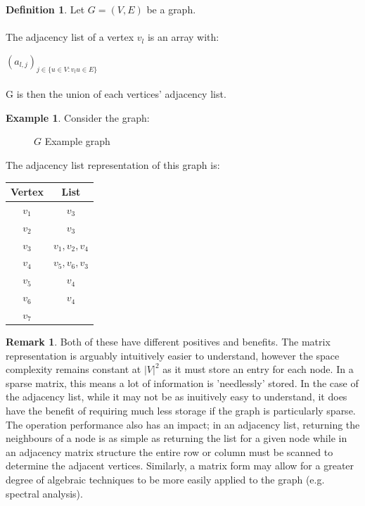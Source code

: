 \documentclass[11pt,reqno]{amsart}
\theoremstyle{definition}
\newtheorem{definition}{Definition}
\newtheorem{remark}[thm]{Remark}
\newtheorem{example}[thm]{Example}
\numberwithin{equation}{section}
\begin{document}
\begin{definition}
	Let $G=(V,E)$ be a graph. \\
	\\
	The adjacency list of a vertex $v_l$ is an array with:
	
	$(a_{l,j})_{j \in \{u \in V : v_lu \in E\}}$\\
	\\
	G is then the union of each vertices' adjacency list.
\end{definition}

\begin{example}
	Consider the graph:
	\begin{figure}[h!]
		\caption{$G$ Example graph}
		\label{fig:Forest9}
	\end{figure}
	
	The adjacency list representation of this graph is:

	\begin{table}[h]
		\begin{tabular}{|c|c|}
			\hline
		\textbf{Vertex}&\textbf{List}\\
		\hline
		$v_1$&$v_3$\\
		\hline
		$v_2$&$v_3$\\
		\hline
		$v_3$&$v_1,v_2,v_4$\\
		\hline
		$v_4$&$v_5,v_6,v_3$\\
		\hline
		$v_5$&$v_4$\\
		\hline
		$v_6$&$v_4$\\
		\hline
		$v_7$&\\
		\hline
		\end{tabular}
	\end{table} 
\end{example}

\begin{remark}
	Both of these have different positives and benefits. The matrix representation is arguably intuitively easier to understand, however the space complexity remains constant at $|V|^2$ as it must store an entry for each node. In a sparse matrix, this means a lot of information is 'needlessly' stored. In the case of the adjacency list, while it may not be as inuitively easy to understand, it does have the benefit of requiring much less storage if the graph is particularly sparse. The operation performance also has an impact; in an adjacency list, returning the neighbours of a node is as simple as returning the list for a given node while in an adjacency matrix structure the entire row or column must be scanned to determine the adjacent vertices. Similarly, a matrix form may allow for a greater degree of algebraic techniques to be more easily applied to the graph (e.g. spectral analysis).
\end{remark}
\end{document}
